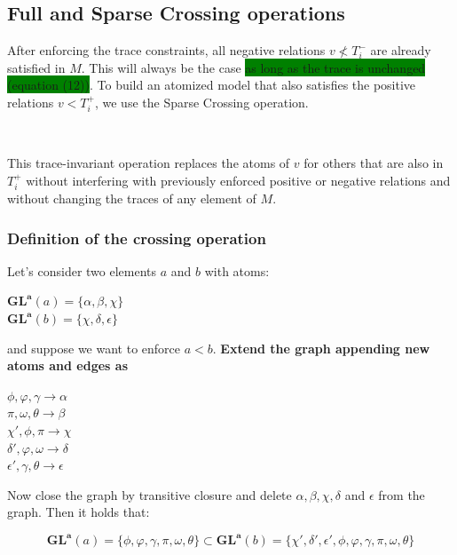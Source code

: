 \documentclass[a4paper, 11pt]{article}
\begin{document}
\subsection{Full and Sparse Crossing operations}

After enforcing the trace constraints, all negative relations $v \not< T_i^-$ are already satisfied in $M$. This will always be the case \colorbox{green}{as long as the trace is unchanged (equation (12))}. To build an atomized model that also satisfies the positive relations $v < T_i^+$, we use the Sparse Crossing operation.

\

This trace-invariant operation replaces
the atoms of $v$ for others that are also in $T_i^+$ without interfering with previously enforced positive or negative relations and without changing the traces of any element of $M$.

\subsubsection{Definition of the crossing operation}

Let's consider two elements $a$ and $b$ with atoms:

\begin{center}
    $\boldsymbol{GL}^{\boldsymbol{a}}(a) = \{ \alpha, \beta, \chi \}$ \\
    $\boldsymbol{GL}^{\boldsymbol{a}}(b) = \{\chi, \delta, \epsilon \}$
\end{center}

and suppose we want to enforce $a < b$. \textbf{Extend the graph appending new atoms and edges as}

\begin{center}
    $\phi, \varphi, \gamma \rightarrow \alpha$ \\
    $\pi, \omega, \theta \rightarrow \beta$ \\
    $\chi', \phi, \pi \rightarrow \chi$ \\
    $\delta', \varphi, \omega \rightarrow \delta$ \\
    $\epsilon', \gamma, \theta \rightarrow \epsilon$
\end{center}

Now close the graph by transitive closure and delete $\alpha, \beta, \chi, \delta$ and $\epsilon$ from the graph. Then it holds that:

\begin{equation*}
    \boldsymbol{GL}^{\boldsymbol{a}}(a) = \{ \phi, \varphi, \gamma, \pi, \omega, \theta \} \subset \boldsymbol{GL}^{\boldsymbol{a}}(b) = \{ \chi', \delta', \epsilon', \phi, \varphi, \gamma, \pi, \omega, \theta \}
\end{equation*}
\end{document}
